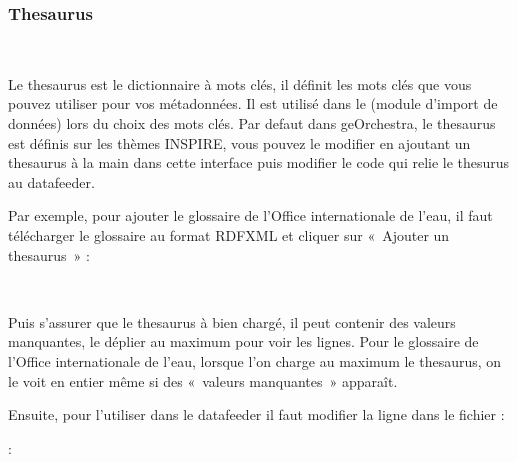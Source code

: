 \documentclass[letterpaper,10pt,french]{sphinxmanual}
\let\sphinxpxdimen\pdfpxdimen\else\newdimen\sphinxpxdimen
\begin{document}
\subsubsection{Thesaurus}
\label{\detokenize{doc_admin/catalogue:thesaurus}}\label{\detokenize{doc_admin/catalogue:id1}}\begin{quote}

\noindent{\hspace*{\fill}\sphinxincludegraphics[width=700\sphinxpxdimen]{{cat_thes}.png}\hspace*{\fill}}
\end{quote}

\sphinxAtStartPar
 

\sphinxAtStartPar
Le thesaurus est le dictionnaire à mots clés, il définit les mots clés que vous pouvez utiliser pour vos métadonnées. Il est utilisé dans le (module d’import de données)
lors du choix des mots clés. Par defaut dans geOrchestra, le thesaurus est définis sur les thèmes INSPIRE, vous pouvez le modifier en ajoutant un thesaurus à la main
dans cette interface puis modifier le code qui relie le thesurus au datafeeder.

\sphinxAtStartPar
Par exemple, pour ajouter le glossaire de l’Office internationale de l’eau, il faut télécharger le glossaire au format RDF\sphinxhyphen{}XML et cliquer sur « Ajouter un thesaurus » :
\begin{quote}

\noindent{\hspace*{\fill}\sphinxincludegraphics[width=700\sphinxpxdimen]{{thesaurus}.png}\hspace*{\fill}}
\end{quote}

\sphinxAtStartPar
 

\sphinxAtStartPar
Puis s’assurer que le thesaurus à bien chargé, il peut contenir des valeurs manquantes, le déplier au maximum pour voir les lignes. Pour le glossaire de l’Office
internationale de l’eau, lorsque l’on charge au maximum le thesaurus, on le voit en entier même si des « valeurs manquantes » apparaît.

\sphinxAtStartPar
Ensuite, pour l’utiliser dans le datafeeder il faut modifier la ligne dans le fichier :

\begin{sphinxVerbatim}[commandchars=\\\{\}]
:
\end{sphinxVerbatim}
\end{document}
